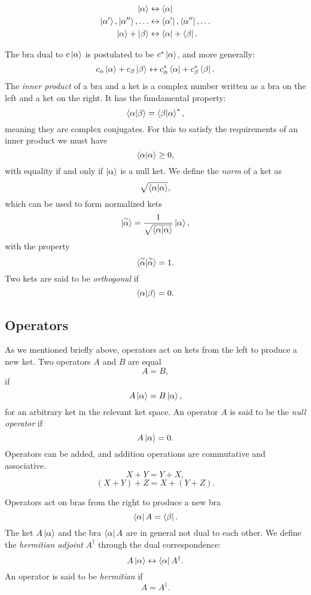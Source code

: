 \begin{equation}
\begin{split}
\ket{\alpha} &\leftrightarrow \bra{\alpha} \\
\ket{\alpha '}, \ket{\alpha ''},\dots &\leftrightarrow \bra{\alpha '}, 
    \bra{\alpha ''},\dots \\
\ket{\alpha} + \ket{\beta} &\leftrightarrow \bra{\alpha} + \bra{\beta} .
\end{split}
\end{equation}

The bra dual to $c \ket{\alpha}$ is postulated to be $c^* \ket{\alpha}$,
and more generally:
$$ c_{\alpha} \ket{\alpha} + c_{\beta} \ket{\beta} \leftrightarrow
c_{\alpha}^* \bra{\alpha} + c_{\beta}^* \bra{\beta} .$$
The \textit{inner product} of a bra and a ket is a complex number
written as a bra on the left and a ket on the right.
It has the fundamental property:
$$ \braket{\alpha | \beta} = \braket{\beta | \alpha}^* ,$$
meaning they are complex conjugates.
For this to satisfy the requirements of an inner product we must have
$$ \braket{\alpha | \alpha} \geq 0 ,$$
with equality if and only if $\ket{\alpha}$ is a null ket.
We define the \textit{norm} of a ket as
$$ \sqrt{\braket{\alpha | \alpha}} ,$$
which can be used to form normalized kets
$$ \ket{\overset{\sim}{\alpha}} =
\frac{1}{\sqrt{\braket{\alpha | \alpha}}} \ket{\alpha} ,$$
with the property
$$ \braket{\overset{\sim}{\alpha} | \overset{\sim}{\alpha}} = 1 .$$
Two kets are said to be \textit{orthogonal} if
$$ \braket{\alpha | \beta} = 0 .$$

\subsection{Operators}
As we mentioned briefly above, operators act on kets from the left
to produce a new ket. Two operators $A$ and $B$ are equal
$$ A = B ,$$
if
$$ A \ket{\alpha} = B \ket{\alpha} ,$$
for an arbitrary ket in the relevant ket space. An operator $A$
is said to be the \textit{null operator} if
$$ A \ket{\alpha} = 0 .$$
Operators can be added, and addition operations are commutative and associative.
$$ X + Y = Y + X ,$$
$$ (X + Y) + Z = X + (Y + Z) .$$
\par
Operators act on bras from the right to produce a new bra
$$ \bra{\alpha} A = \bra{\beta} .$$
The ket $A \ket{\alpha}$ and the bra $\bra{\alpha} A$ are in general
not dual to each other. We define the \textit{hermitian adjoint} $A^{\dagger}$
through the dual correspondence:
$$ A \ket{\alpha} \leftrightarrow \bra{\alpha} A^{\dagger} .$$
An operator is said to be \textit{hermitian} if
$$ A = A^{\dagger} .$$

